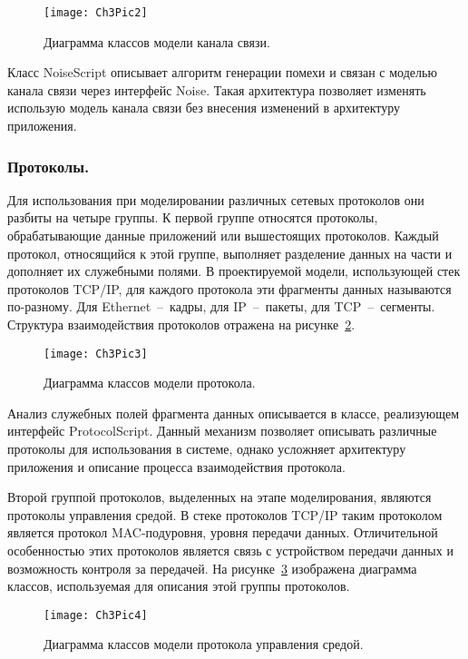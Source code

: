     \begin{figure}[h!]\center
        \texttt{[image: Ch3Pic2]}
        \caption{Диаграмма классов модели канала связи. } \label{Pic2}
    \end{figure}

    Класс NoiseScript описывает алгоритм генерации помехи и связан с моделью канала связи через интерфейс Noise. Такая архитектура позволяет изменять использую модель канала связи без внесения изменений в архитектуру приложения.

    \subsubsection{Протоколы. }

    Для использования при моделировании различных сетевых протоколов они разбиты на четыре группы. К первой группе относятся протоколы, обрабатывающие данные приложений или вышестоящих протоколов. Каждый протокол, относящийся к этой группе, выполняет разделение данных на части и дополняет их служебными полями. В проектируемой модели, использующей стек протоколов TCP/IP, для каждого протокола эти фрагменты данных называются по-разному. Для Ethernet~--~кадры, для IP~--~пакеты, для TCP~--~сегменты. Структура взаимодействия протоколов отражена на рисунке~\ref{Pic3}.

    \begin{figure}[h!]\center
        \texttt{[image: Ch3Pic3]}
        \caption{Диаграмма классов модели протокола. } \label{Pic3}
    \end{figure}

    Анализ служебных полей фрагмента данных описывается в классе, реализующем интерфейс ProtocolScript. Данный механизм позволяет описывать различные протоколы для использования в системе, однако усложняет архитектуру приложения и описание процесса взаимодействия протокола.

    Второй группой протоколов, выделенных на этапе моделирования, являются протоколы управления средой. В стеке протоколов TCP/IP таким протоколом является протокол MAC-подуровня, уровня передачи данных. Отличительной особенностью этих протоколов является связь с устройством передачи данных и возможность контроля за передачей. На рисунке~\ref{Pic4} изображена диаграмма классов, используемая для описания этой группы протоколов.

    \begin{figure}[h!]\center
        \texttt{[image: Ch3Pic4]}
        \caption{Диаграмма классов модели протокола управления средой. } \label{Pic4}
    \end{figure}

